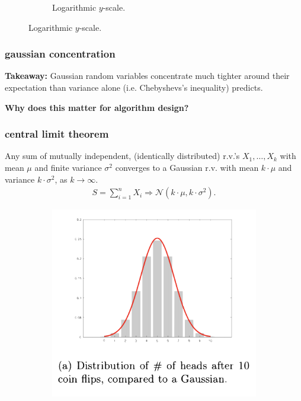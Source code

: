 \documentclass[compress]{beamer}
\begin{document}
\begin{frame}
\begin{figure}
\begin{subfigure}[t]{0.45\textwidth}
			\caption{Logarithmic $y$-scale.}
		\end{subfigure}
	\end{figure}
	
\end{frame}

\begin{frame}
	\frametitle{gaussian concentration}
	\textbf{Takeaway:} Gaussian random variables concentrate much tighter around their expectation than variance alone (i.e. Chebyshevs's inequality)  predicts.
	
	\begin{center}
		\alert{\textbf{Why does this matter for algorithm design?}}
	\end{center}
\end{frame}

\begin{frame}
	\frametitle{central limit theorem}
	\begin{theorem}
		Any sum of \alert{mutually independent}, \alert{(identically distributed)}  r.v.'s $X_1,  \ldots, X_k$ with mean $\mu$ and finite variance $\sigma^2$ converges to a Gaussian r.v. with mean $k\cdot\mu$ and variance $k\cdot\sigma^2$, as $k\rightarrow \infty$.
		\vspace{-.5em}
		\begin{align*}
			S = \sum_{i=1}^n X_i \Longrightarrow \mathcal{N}(k\cdot\mu, k\cdot\sigma^2).
		\end{align*}	
		\vspace{-.5em}	
	\end{theorem}
	\vspace{-.5em}	
	\begin{figure}
		\begin{subfigure}[t]{0.4\textwidth}
			\centering
			\includegraphics[width=\textwidth]{cltWide.png}

\end{subfigure}
\end{figure}
\end{frame}
\end{document}
